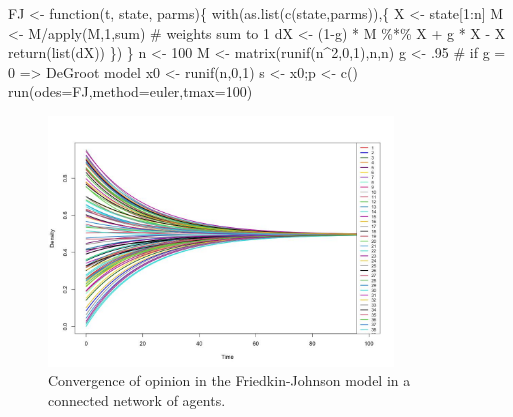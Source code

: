 \documentclass[
  letterpaper,
]{scrbook}
\newenvironment{Shaded}{\begin{snugshade}}{\end{snugshade}}
\newcommand{\AttributeTok}[1]{\textcolor[rgb]{0.40,0.45,0.13}{#1}}
\newcommand{\CommentTok}[1]{\textcolor[rgb]{0.37,0.37,0.37}{#1}}
\newcommand{\ControlFlowTok}[1]{\textcolor[rgb]{0.00,0.23,0.31}{#1}}
\newcommand{\DecValTok}[1]{\textcolor[rgb]{0.68,0.00,0.00}{#1}}
\newcommand{\FunctionTok}[1]{\textcolor[rgb]{0.28,0.35,0.67}{#1}}
\newcommand{\NormalTok}[1]{\textcolor[rgb]{0.00,0.23,0.31}{#1}}
\newcommand{\OtherTok}[1]{\textcolor[rgb]{0.00,0.23,0.31}{#1}}
\newcommand{\SpecialCharTok}[1]{\textcolor[rgb]{0.37,0.37,0.37}{#1}}
\newcommand{\StringTok}[1]{\textcolor[rgb]{0.13,0.47,0.30}{#1}}
\begin{document}
\begin{Shaded}
\begin{Highlighting}[]
\NormalTok{FJ }\OtherTok{\textless{}{-}} \ControlFlowTok{function}\NormalTok{(t, state, parms)\{}
  \FunctionTok{with}\NormalTok{(}\FunctionTok{as.list}\NormalTok{(}\FunctionTok{c}\NormalTok{(state,parms)),\{}
\NormalTok{    X }\OtherTok{\textless{}{-}}\NormalTok{ state[}\DecValTok{1}\SpecialCharTok{:}\NormalTok{n]}
\NormalTok{    M }\OtherTok{\textless{}{-}}\NormalTok{ M}\SpecialCharTok{/}\FunctionTok{apply}\NormalTok{(M,}\DecValTok{1}\NormalTok{,sum) }\CommentTok{\# weights sum to 1}
\NormalTok{    dX }\OtherTok{\textless{}{-}}\NormalTok{ (}\DecValTok{1}\SpecialCharTok{{-}}\NormalTok{g) }\SpecialCharTok{*}\NormalTok{ M }\SpecialCharTok{\%*\%}\NormalTok{ X  }\SpecialCharTok{+}\NormalTok{ g }\SpecialCharTok{*}\NormalTok{ X }\SpecialCharTok{{-}}\NormalTok{ X}
    \FunctionTok{return}\NormalTok{(}\FunctionTok{list}\NormalTok{(dX))}
\NormalTok{  \})}
\NormalTok{\}}
\NormalTok{n }\OtherTok{\textless{}{-}} \DecValTok{100}
\NormalTok{M }\OtherTok{\textless{}{-}} \FunctionTok{matrix}\NormalTok{(}\FunctionTok{runif}\NormalTok{(n}\SpecialCharTok{\^{}}\DecValTok{2}\NormalTok{,}\DecValTok{0}\NormalTok{,}\DecValTok{1}\NormalTok{),n,n)}
\NormalTok{g }\OtherTok{\textless{}{-}}\NormalTok{ .}\DecValTok{95} \CommentTok{\# if g  = 0 =\textgreater{} DeGroot model}
\NormalTok{x0 }\OtherTok{\textless{}{-}} \FunctionTok{runif}\NormalTok{(n,}\DecValTok{0}\NormalTok{,}\DecValTok{1}\NormalTok{)}
\NormalTok{s }\OtherTok{\textless{}{-}}\NormalTok{ x0;p  }\OtherTok{\textless{}{-}} \FunctionTok{c}\NormalTok{() }
\FunctionTok{run}\NormalTok{(}\AttributeTok{odes=}\NormalTok{FJ,}\AttributeTok{method=}\StringTok{\textquotesingle{}euler\textquotesingle{}}\NormalTok{,}\AttributeTok{tmax=}\DecValTok{100}\NormalTok{)}
\end{Highlighting}
\end{Shaded}

\begin{figure}

{\centering \includegraphics[width=3.6001in,height=\textheight]{media/ch7/image7.jpg}

}

\caption{\label{fig-ch7-img7-old-95}Convergence of opinion in the
Friedkin-Johnson model in a connected network of agents.}

\end{figure}
\end{document}
